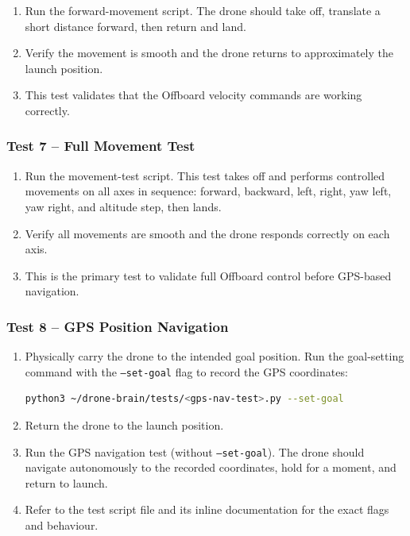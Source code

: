 \documentclass{article}
\begin{document}
\begin{enumerate}
    \item Run the forward-movement script. The drone should take off, translate a short distance forward, then return and land.
    \item Verify the movement is smooth and the drone returns to approximately the launch position.
    \item This test validates that the Offboard velocity commands are working correctly.
\end{enumerate}

\subsubsection{Test 7 -- Full Movement Test}

\begin{enumerate}
    \item Run the movement-test script. This test takes off and performs controlled movements on all axes in sequence: forward, backward, left, right, yaw left, yaw right, and altitude step, then lands.
    \item Verify all movements are smooth and the drone responds correctly on each axis.
    \item This is the primary test to validate full Offboard control before GPS-based navigation.
\end{enumerate}

\subsubsection{Test 8 -- GPS Position Navigation}

\begin{enumerate}
    \item Physically carry the drone to the intended goal position. Run the goal-setting command with the \texttt{--set-goal} flag to record the GPS coordinates:
\begin{lstlisting}[language=bash]
python3 ~/drone-brain/tests/<gps-nav-test>.py --set-goal
\end{lstlisting}
    \item Return the drone to the launch position.
    \item Run the GPS navigation test (without \texttt{--set-goal}). The drone should navigate autonomously to the recorded coordinates, hold for a moment, and return to launch.
    \item Refer to the test script file and its inline documentation for the exact flags and behaviour.
\end{enumerate}
\end{document}
